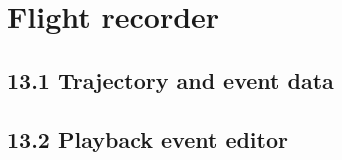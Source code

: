 \documentclass[Orbiter User Manual.tex]{subfiles}
\begin{document}
\section{Flight recorder}

\subsection{13.1 Trajectory and event data}

\subsection{13.2 Playback event editor}
\end{document}
